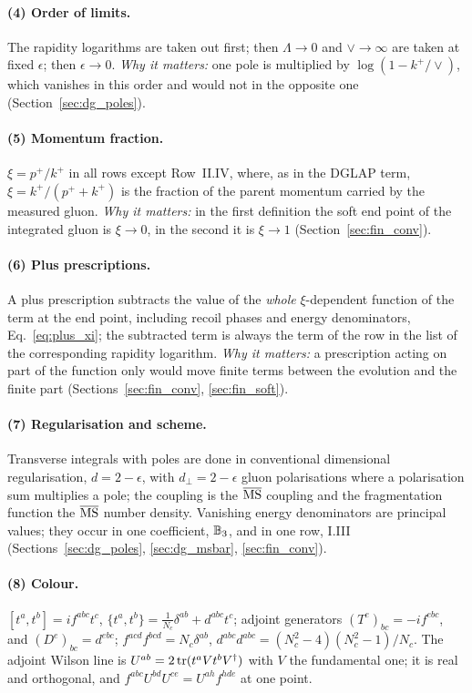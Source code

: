 \paragraph{(4) Order of limits.} The rapidity logarithms are taken out first; then $\Lambda\to0$ and $\vee\to\infty$ are taken at fixed $\epsilon$; then $\epsilon\to0$. \emph{Why it matters:} one pole is multiplied by $\log(1-k^+/\vee)$, which vanishes in this order and would not in the opposite one (Section~\ref{sec:dg_poles}).

\paragraph{(5) Momentum fraction.} $\xi=p^+/k^+$ in all rows except Row~II.IV, where, as in the DGLAP term, $\xi=k^+/(p^++k^+)$ is the fraction of the parent momentum carried by the measured gluon. \emph{Why it matters:} in the first definition the soft end point of the integrated gluon is $\xi\to0$, in the second it is $\xi\to1$ (Section~\ref{sec:fin_conv}).

\paragraph{(6) Plus prescriptions.} A plus prescription subtracts the value of the \emph{whole} $\xi$-dependent function of the term at the end point, including recoil phases and energy denominators, Eq.~\eqref{eq:plus_xi}; the subtracted term is always the term of the row in the list of the corresponding rapidity logarithm. \emph{Why it matters:} a prescription acting on part of the function only would move finite terms between the evolution and the finite part (Sections~\ref{sec:fin_conv}, \ref{sec:fin_soft}).

\paragraph{(7) Regularisation and scheme.} Transverse integrals with poles are done in conventional dimensional regularisation, $d=2-\epsilon$, with $d_\perp=2-\epsilon$ gluon polarisations where a polarisation sum multiplies a pole; the coupling is the $\overline{\rm MS}$ coupling and the fragmentation function the $\overline{\rm MS}$ number density. Vanishing energy denominators are principal values; they occur in one coefficient, $\mathbb{B}_3$, and in one row, I.III (Sections~\ref{sec:dg_poles}, \ref{sec:dg_msbar}, \ref{sec:fin_conv}).

\paragraph{(8) Colour.} $[t^a,t^b]=if^{abc}t^c$, $\{t^a,t^b\}=\frac1{N_c}\delta^{ab}+d^{abc}t^c$; adjoint generators $(T^e)_{bc}=-if^{ebc}$, and $(D^e)_{bc}=d^{ebc}$; $f^{acd}f^{bcd}=N_c\delta^{ab}$, $d^{abc}d^{abc}=(N_c^2-4)(N_c^2-1)/N_c$. The adjoint Wilson line is $U^{ab}=2\,{\rm tr}(t^aVt^bV^\dagger)$ with $V$ the fundamental one; it is real and orthogonal, and $f^{abc}U^{bd}U^{ce}=U^{ah}f^{hde}$ at one point.

